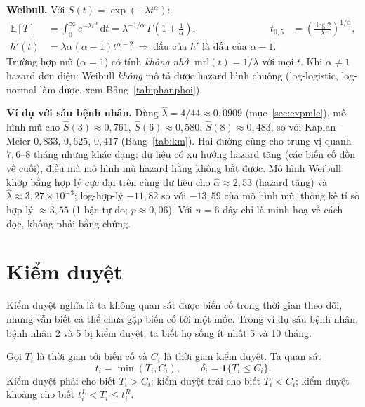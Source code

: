 \documentclass[11pt,a4paper,notitlepage]{report}
\newcommand{\E}{\mathbb{E}}
\newcommand{\ind}{\mathbf{1}}
\newcommand{\dd}{\,\mathrm{d}}
\begin{document}
\begin{bosung}
\textbf{Weibull.} Với $S(t)=\exp(-\lambda t^\alpha)$:
\begin{align}
\E[T]&=\int_0^\infty e^{-\lambda t^\alpha}\dd t=\lambda^{-1/\alpha}\,\Gamma\!\left(1+\tfrac1\alpha\right),&
t_{0{,}5}&=\left(\frac{\log2}{\lambda}\right)^{1/\alpha},\\
h'(t)&=\lambda\alpha(\alpha-1)t^{\alpha-2}\ \Rightarrow\ \text{dấu của }h'\text{ là dấu của }\alpha-1.&&
\end{align}
Trường hợp mũ ($\alpha=1$) có tính \emph{không nhớ}: $\mathrm{mrl}(t)=1/\lambda$ với mọi $t$.
Khi $\alpha\ne1$ hazard đơn điệu; Weibull \emph{không} mô tả được hazard hình chuông (log-logistic, log-normal làm được, xem Bảng~\ref{tab:phanphoi}).

\textbf{Ví dụ với sáu bệnh nhân.} Dùng $\hat\lambda=4/44\approx0{,}0909$ (mục~\ref{sec:expmle}), mô hình mũ cho
$\hat S(3)\approx0{,}761$, $\hat S(6)\approx0{,}580$, $\hat S(8)\approx0{,}483$, so với Kaplan--Meier $0{,}833$, $0{,}625$, $0{,}417$ (Bảng~\ref{tab:km}).
Hai đường cùng cho trung vị quanh $7{,}6$--$8$ tháng nhưng khác dạng: dữ liệu có xu hướng hazard tăng (các biến cố dồn về cuối),
điều mà mô hình mũ hazard hằng không bắt được. Mô hình Weibull khớp bằng hợp lý cực đại trên cùng dữ liệu cho $\hat\alpha\approx2{,}53$ (hazard tăng) và
$\hat\lambda\approx3{,}27\times10^{-3}$; log-hợp-lý $-11{,}82$ so với $-13{,}59$ của mô hình mũ, thống kê tỉ số hợp lý $\approx3{,}55$ (1 bậc tự do; $p\approx0{,}06$). Với $n=6$ đây chỉ là minh hoạ về cách đọc,
không phải bằng chứng.
\end{bosung}

\section{Kiểm duyệt}\label{sec:kiemduyet}

Kiểm duyệt nghĩa là ta không quan sát được biến cố trong thời gian theo dõi, nhưng vẫn biết cá
thể chưa gặp biến cố tới một mốc. Trong ví dụ sáu bệnh nhân, bệnh nhân 2 và 5 bị kiểm duyệt;
ta biết họ sống ít nhất 5 và 10 tháng.

Gọi $T_i$ là thời gian tới biến cố và $C_i$ là thời gian kiểm duyệt. Ta quan sát
\begin{equation}
t_i=\min(T_i,C_i),\qquad\delta_i=\ind\{T_i\le C_i\}.
\end{equation}
Kiểm duyệt phải cho biết $T_i>C_i$; kiểm duyệt trái cho biết $T_i<C_i$; kiểm duyệt khoảng cho biết
$t_i^L<T_i\le t_i^R$.
\end{document}
